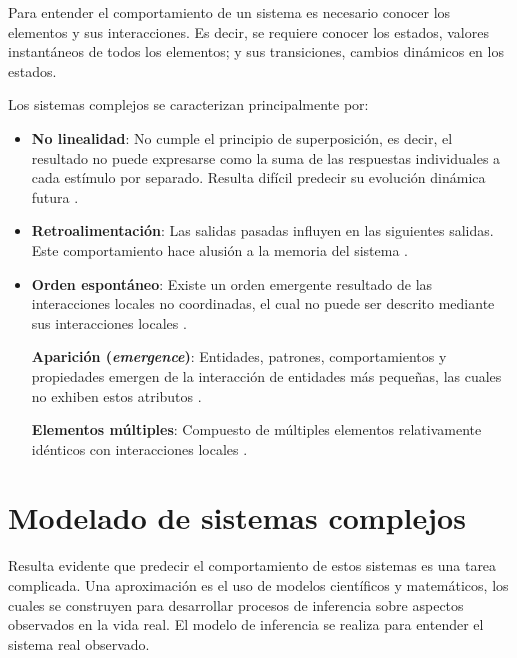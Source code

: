 Para entender el comportamiento de un sistema es necesario conocer los elementos y sus interacciones. Es decir, se requiere conocer los estados, valores instantáneos de todos los elementos; y sus transiciones, cambios dinámicos en los estados.

Los sistemas complejos se caracterizan principalmente por:

\begin{itemize}
	
	\item \textbf{No linealidad}: No cumple el principio de superposición, es decir, el resultado no puede expresarse como la suma de las respuestas individuales a cada estímulo por separado. Resulta difícil predecir su evolución dinámica futura \cite{cs_def_2, cs_def_3}.
	
	
	
	\item \textbf{Retroalimentación}: Las salidas pasadas influyen en las siguientes salidas. Este comportamiento hace alusión a la memoria del sistema \cite{cs_def_3}. 
	
	
	
	\item \textbf{Orden espontáneo}: Existe un orden emergente resultado de las interacciones locales no coordinadas, el cual no puede ser descrito mediante sus interacciones locales \cite{cs_def_3}.
	
	
	
	\textbf{Aparición (\textit{emergence})}: Entidades, patrones, comportamientos y propiedades emergen de la interacción de entidades más pequeñas, las cuales no exhiben estos atributos \cite{cs_def_3}.
	
	
	
	\textbf{Elementos múltiples}: Compuesto de múltiples elementos relativamente idénticos con interacciones locales \cite{cs_def_2}. 
	
\end{itemize}

\section{Modelado de sistemas complejos}

Resulta evidente que predecir el comportamiento de estos sistemas es una tarea complicada. Una aproximación es el uso de modelos científicos y matemáticos, los cuales se construyen para desarrollar procesos de inferencia sobre aspectos observados en la vida real. El modelo de inferencia se realiza para entender el sistema real observado.

